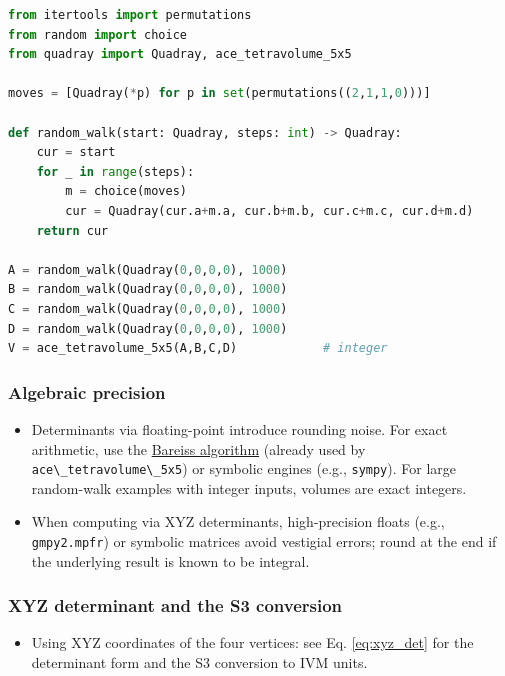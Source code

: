 \documentclass[
  10pt,
]{article}
\newcommand{\passthrough}[1]{#1}
\providecommand{\tightlist}{%
  \setlength{\itemsep}{0pt}\setlength{\parskip}{0pt}}
\begin{document}
\begin{lstlisting}[language=Python]
from itertools import permutations
from random import choice
from quadray import Quadray, ace_tetravolume_5x5

moves = [Quadray(*p) for p in set(permutations((2,1,1,0)))]

def random_walk(start: Quadray, steps: int) -> Quadray:
    cur = start
    for _ in range(steps):
        m = choice(moves)
        cur = Quadray(cur.a+m.a, cur.b+m.b, cur.c+m.c, cur.d+m.d)
    return cur

A = random_walk(Quadray(0,0,0,0), 1000)
B = random_walk(Quadray(0,0,0,0), 1000)
C = random_walk(Quadray(0,0,0,0), 1000)
D = random_walk(Quadray(0,0,0,0), 1000)
V = ace_tetravolume_5x5(A,B,C,D)            # integer
\end{lstlisting}

\hypertarget{algebraic-precision}{%
\subsubsection{Algebraic precision}\label{algebraic-precision}}

\begin{itemize}
\tightlist
\item
  Determinants via floating-point introduce rounding noise. For exact
  arithmetic, use the
  \href{https://en.wikipedia.org/wiki/Bareiss_algorithm}{Bareiss
  algorithm} (already used by
  \passthrough{\lstinline!ace\_tetravolume\_5x5!}) or symbolic engines
  (e.g., \passthrough{\lstinline!sympy!}). For large random-walk
  examples with integer inputs, volumes are exact integers.
\item
  When computing via XYZ determinants, high-precision floats (e.g.,
  \passthrough{\lstinline!gmpy2.mpfr!}) or symbolic matrices avoid
  vestigial errors; round at the end if the underlying result is known
  to be integral.
\end{itemize}

\hypertarget{xyz-determinant-and-the-s3-conversion}{%
\subsubsection{XYZ determinant and the S3
conversion}\label{xyz-determinant-and-the-s3-conversion}}

\begin{itemize}
\tightlist
\item
  Using XYZ coordinates of the four vertices: see Eq. \eqref{eq:xyz_det}
  for the determinant form and the S3 conversion to IVM units.
\end{itemize}
\end{document}
